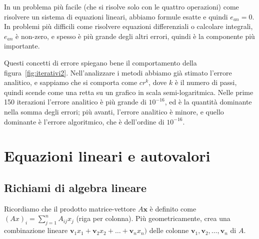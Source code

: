 \documentclass[a4paper]{report}
\theoremstyle{definiton}
\theoremstyle{remark}
\begin{document}
In un problema più facile (che si risolve solo con le quattro operazioni) come risolvere un sistema di equazioni lineari, abbiamo formule esatte e quindi $e_{an} = 0$. In problemi più difficili come risolvere equazioni differenziali o calcolare integrali, $e_{an}$ è non-zero, e spesso è più grande degli altri errori, quindi è la componente più importante.

Questi concetti di errore spiegano bene il comportamento della figura~\ref{fig:iterativi2}. Nell'analizzare i metodi abbiamo già stimato l'errore analitico, e sappiamo che si comporta come $cr^k$, dove $k$ è il numero di passi, quindi scende come una retta su un grafico in scala semi-logaritmica. Nelle prime 150 iterazioni l'errore analitico è più grande di $10^{-16}$, ed è la quantità dominante nella somma degli errori; più avanti, l'errore analitico è minore, e quello dominante è l'errore algoritmico, che è dell'ordine di $10^{-16}$.

\chapter{Equazioni lineari e autovalori}

\section{Richiami di algebra lineare}

Ricordiamo che il prodotto matrice-vettore $A \mathbf{x}$ è definito come $(Ax)_i = \sum_{j=1}^n A_{ij}x_j$ (riga per colonna). Più geometricamente, crea una combinazione lineare $\mathbf{v}_1 x_1 + \mathbf{v}_2 x_2 + \dots + \mathbf{v}_n x_n)$ delle colonne $\mathbf{v}_1, \mathbf{v}_2, \dots, \mathbf{v}_n$ di $A$. 


\end{document}
